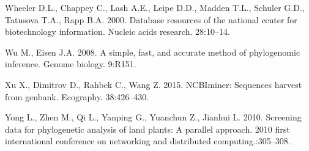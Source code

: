 \documentclass[]{article}
\begin{document}
\leavevmode\hypertarget{ref-wheeler2000database}{}%
Wheeler D.L., Chappey C., Lash A.E., Leipe D.D., Madden T.L., Schuler G.D., Tatusova T.A., Rapp B.A. 2000. Database resources of the national center for biotechnology information. Nucleic acids research. 28:10--14.

\leavevmode\hypertarget{ref-wu2008simple}{}%
Wu M., Eisen J.A. 2008. A simple, fast, and accurate method of phylogenomic inference. Genome biology. 9:R151.

\leavevmode\hypertarget{ref-xu2015ncbiminer}{}%
Xu X., Dimitrov D., Rahbek C., Wang Z. 2015. NCBIminer: Sequences harvest from genbank. Ecography. 38:426--430.

\leavevmode\hypertarget{ref-yong2010screening}{}%
Yong L., Zhen M., Qi L., Yanping G., Yuanchun Z., Jianhui L. 2010. Screening data for phylogenetic analysis of land plants: A parallel approach. 2010 first international conference on networking and distributed computing.:305--308.
\end{document}
